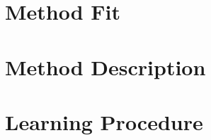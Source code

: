 \documentclass[11pt]{article}
\begin{document}


\section{Method Fit}



\section{Method Description}


\section{Learning Procedure}

\end{document}

